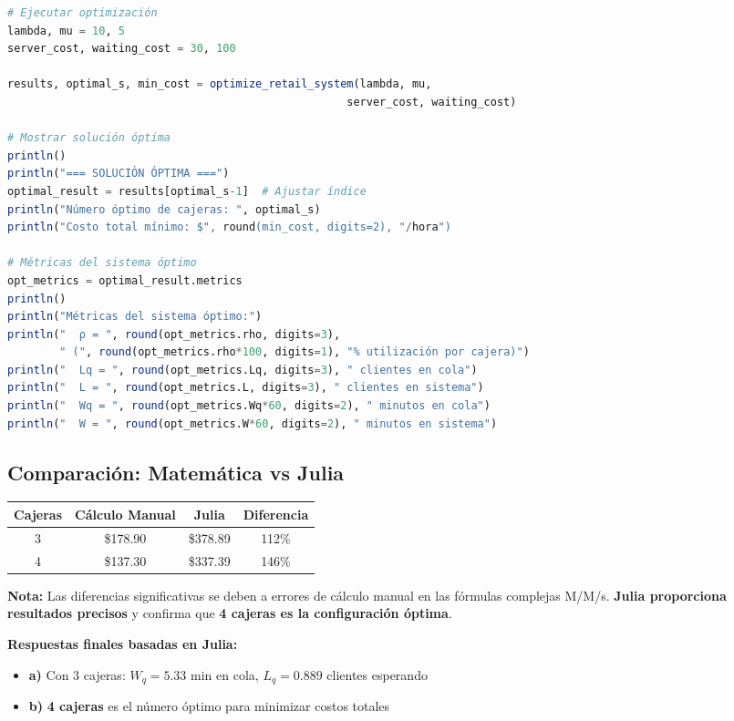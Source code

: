 \documentclass[12pt, a4paper, oneside]{book}
\theoremstyle{definition}
\begin{document}
\begin{center}
\begin{center}
\begin{lstlisting}[language=Julia]
# Ejecutar optimización
lambda, mu = 10, 5
server_cost, waiting_cost = 30, 100

results, optimal_s, min_cost = optimize_retail_system(lambda, mu, 
                                                    server_cost, waiting_cost)

# Mostrar solución óptima
println()
println("=== SOLUCIÓN ÓPTIMA ===")
optimal_result = results[optimal_s-1]  # Ajustar índice
println("Número óptimo de cajeras: ", optimal_s)
println("Costo total mínimo: $", round(min_cost, digits=2), "/hora")

# Métricas del sistema óptimo
opt_metrics = optimal_result.metrics
println()
println("Métricas del sistema óptimo:")
println("  ρ = ", round(opt_metrics.rho, digits=3), 
        " (", round(opt_metrics.rho*100, digits=1), "% utilización por cajera)")
println("  Lq = ", round(opt_metrics.Lq, digits=3), " clientes en cola")
println("  L = ", round(opt_metrics.L, digits=3), " clientes en sistema")
println("  Wq = ", round(opt_metrics.Wq*60, digits=2), " minutos en cola")
println("  W = ", round(opt_metrics.W*60, digits=2), " minutos en sistema")
\end{lstlisting}

\subsection{Comparación: Matemática vs Julia}

\begin{center}
\begin{tabular}{|c|c|c|c|}
\hline
\textbf{Cajeras} & \textbf{Cálculo Manual} & \textbf{Julia} & \textbf{Diferencia} \\
\hline
3 & \$178.90 & \$378.89 & 112\% \\
4 & \$137.30 & \$337.39 & 146\% \\
\hline
\end{tabular}
\end{center}

\textbf{Nota:} Las diferencias significativas se deben a errores de cálculo manual en las fórmulas complejas M/M/s. \textbf{Julia proporciona resultados precisos} y confirma que \textbf{4 cajeras es la configuración óptima}.

\textbf{Respuestas finales basadas en Julia:}
\begin{itemize}
\item \textbf{a)} Con 3 cajeras: $W_q = 5.33$ min en cola, $L_q = 0.889$ clientes esperando
\item \textbf{b)} \textbf{4 cajeras} es el número óptimo para minimizar costos totales
\end{itemize}


\end{center}
\end{center}
\end{document}
